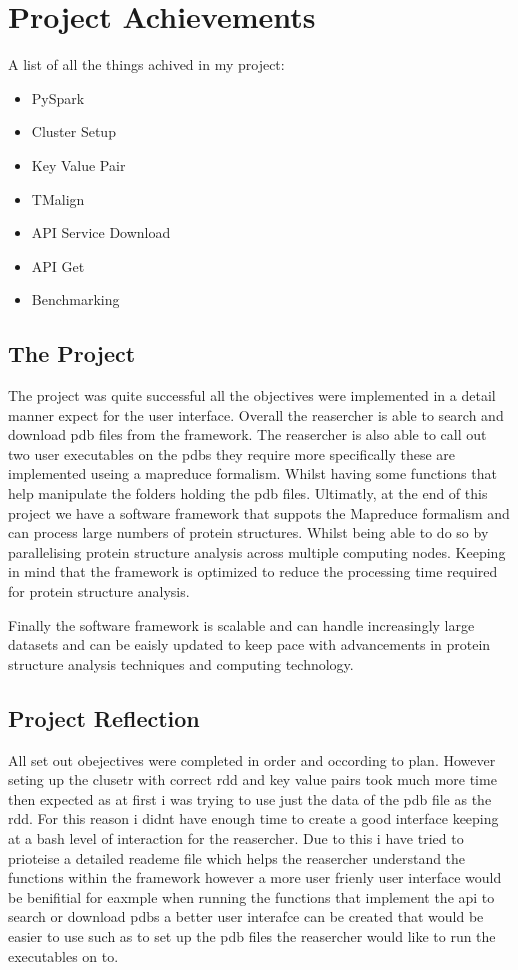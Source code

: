 \documentclass[]{final_report}
\begin{document}
\section{Project Achievements}
A list of all the things achived in my project:

\begin{itemize}
    \item PySpark
    \item Cluster Setup
    \item Key Value Pair
    \item TMalign
    \item API Service Download
    \item API Get
    \item Benchmarking
\end{itemize}

\subsection{The Project}

The project was quite successful all the objectives were implemented in a detail manner expect for the user interface. Overall the reasercher is able to search and download pdb files from the framework. The reasercher is also able to call out two user executables on the pdbs they require more specifically these are implemented useing a mapreduce formalism. Whilst having some functions that help manipulate the folders holding the pdb files. Ultimatly, at the end of this project we have a software framework that suppots the Mapreduce formalism and can process large numbers of protein structures. Whilst being able to do so by parallelising protein structure analysis across multiple computing nodes. Keeping in mind that the framework is optimized to reduce the processing time required for protein structure analysis.

Finally the software framework is scalable and can handle increasingly large datasets and can be eaisly updated to keep pace with advancements in protein structure analysis techniques and computing technology.

\subsection{Project Reflection}

All set out obejectives were completed in order and occording to plan. However seting up the clusetr with correct rdd and key value pairs took much more time then expected as at first i was trying to use just the data of the pdb file as the rdd. For this reason i didnt have enough time to create a good interface keeping at a bash level of interaction for the reasercher. Due to this i have tried to prioteise a detailed reademe file which helps the reasercher understand the functions within the framework however a more user frienly user interface would be benifitial for eaxmple when running the functions that implement the api to search or download pdbs a better user interafce can be created that would be easier to use such as to set up the pdb files the reasercher would like to run the executables on to.
\end{document}

